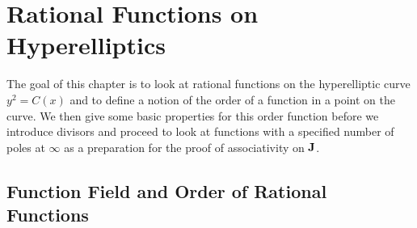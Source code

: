 \documentclass[english,11pt,a4paper]{article}
\begin{document}






\newpage

\section{Rational Functions on Hyperelliptics}

The goal of this chapter is to look at rational functions on the hyperelliptic curve $y^2 = C(x)$ and to define a notion of the order of a function in a point on the curve. We then give some basic properties for this order function before we introduce divisors and proceed to look at functions with a specified number of poles at $\infty$ as a preparation for the proof of associativity on $\mathbf{J}$.

\subsection{Function Field and Order of Rational Functions}
\end{document}
